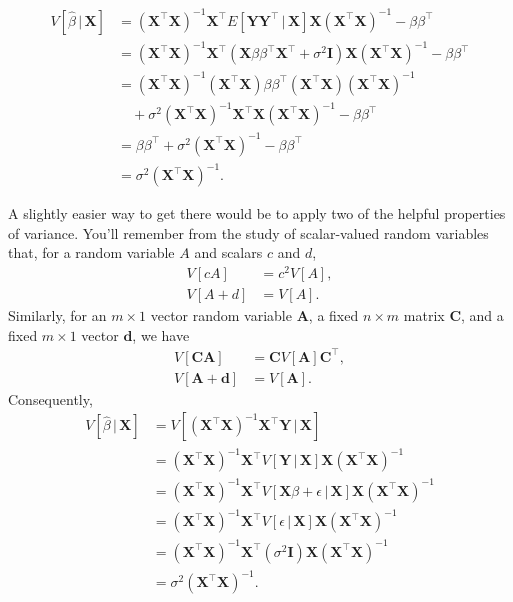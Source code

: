 \documentclass[
  12pt,
  oneside,openany]{book}
\begin{document}
\[
\begin{aligned}
  V[\hat{\beta} \,|\, \mathbf{X}]
  &= (\mathbf{X}^\top \mathbf{X})^{-1} \mathbf{X}^\top E \left[ \mathbf{Y} \mathbf{Y}^\top \,|\, \mathbf{X} \right] \mathbf{X} (\mathbf{X}^\top \mathbf{X})^{-1} - \beta \beta^\top \\
  &= (\mathbf{X}^\top \mathbf{X})^{-1} \mathbf{X}^\top ( \mathbf{X} \beta \beta^\top \mathbf{X}^\top + \sigma^2 \mathbf{I} ) \mathbf{X} (\mathbf{X}^\top \mathbf{X})^{-1} - \beta \beta^\top \\
  &= (\mathbf{X}^\top \mathbf{X})^{-1} (\mathbf{X}^\top \mathbf{X}) \beta \beta^\top (\mathbf{X}^\top \mathbf{X}) (\mathbf{X}^\top \mathbf{X})^{-1} \\ &\quad + \sigma^2 (\mathbf{X}^\top \mathbf{X})^{-1} \mathbf{X}^\top \mathbf{X} (\mathbf{X}^\top \mathbf{X})^{-1} - \beta \beta^\top \\
  &= \beta \beta^\top + \sigma^2 (\mathbf{X}^\top \mathbf{X})^{-1} - \beta \beta^\top \\
  &= \sigma^2 (\mathbf{X}^\top \mathbf{X})^{-1}.
\end{aligned}
\]

A slightly easier way to get there would be to apply two of the helpful properties of variance. You'll remember from the study of scalar-valued random variables that, for a random variable \(A\) and scalars \(c\) and \(d\),
\[
\begin{aligned}
  V[c A] &= c^2 V[A], \\
  V[A + d] &= V[A].
\end{aligned}
\]
Similarly, for an \(m \times 1\) vector random variable \(\mathbf{A}\), a fixed \(n \times m\) matrix \(\mathbf{C}\), and a fixed \(m \times 1\) vector \(\mathbf{d}\), we have
\[
\begin{aligned}
  V[\mathbf{C} \mathbf{A}] &= \mathbf{C} V[\mathbf{A}] \mathbf{C}^\top, \\
  V[\mathbf{A} + \mathbf{d}] &= V[\mathbf{A}].
\end{aligned}
\]
Consequently,
\[
\begin{aligned}
  V \left[ \hat{\beta} \,|\, \mathbf{X} \right]
  &= V[ (\mathbf{X}^\top \mathbf{X})^{-1} \mathbf{X}^\top \mathbf{Y} \,|\, \mathbf{X} ] \\
  &= (\mathbf{X}^\top \mathbf{X})^{-1} \mathbf{X}^\top V [\mathbf{Y} \,|\, \mathbf{X}] \mathbf{X} (\mathbf{X}^\top \mathbf{X})^{-1} \\
  &= (\mathbf{X}^\top \mathbf{X})^{-1} \mathbf{X}^\top V [\mathbf{X} \beta + \epsilon \,|\, \mathbf{X}] \mathbf{X} (\mathbf{X}^\top \mathbf{X})^{-1} \\
  &= (\mathbf{X}^\top \mathbf{X})^{-1} \mathbf{X}^\top V [\epsilon \,|\, \mathbf{X}] \mathbf{X} (\mathbf{X}^\top \mathbf{X})^{-1} \\
  &= (\mathbf{X}^\top \mathbf{X})^{-1} \mathbf{X}^\top (\sigma^2 \mathbf{I}) \mathbf{X} (\mathbf{X}^\top \mathbf{X})^{-1} \\
  &= \sigma^2 (\mathbf{X}^\top \mathbf{X})^{-1}.
\end{aligned}
\]
\end{document}

